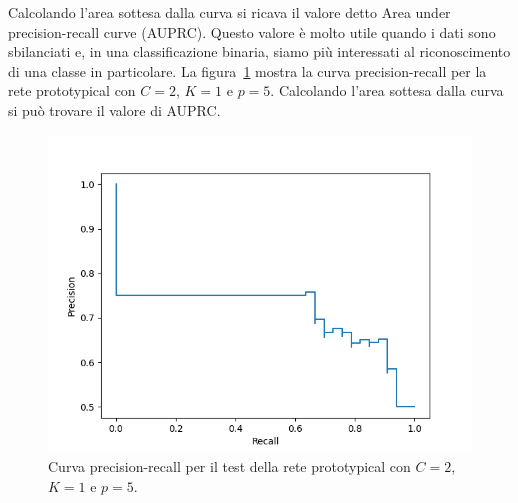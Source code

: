 \documentclass[12pt,a4paper,titlepage]{article}
\begin{document}
Calcolando l'area sottesa dalla curva si ricava il valore detto Area under precision-recall curve (AUPRC).
Questo valore è molto utile quando i dati sono sbilanciati e, in una classificazione binaria, siamo più interessati al riconoscimento di una classe in particolare.
La figura~\ref{fig:prec_rec} mostra la curva precision-recall per la rete prototypical con $C = 2$, $K=1$ e $p = 5$. Calcolando l'area sottesa dalla curva si può trovare il valore di AUPRC.

\begin{figure}[h]
	\centering	
	\includegraphics[width=1\textwidth]{Immagini/pre_rec_2}
	\caption{Curva precision-recall per il test della rete prototypical con $C = 2$, $K=1$ e $p = 5$.}
	\label{fig:prec_rec}
\end{figure}
\clearpage
\end{document}
